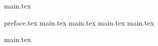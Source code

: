 




\clearpage

{main.tex}

\tableofcontents

\clearpage
{}
\pagestyle{fancy}
\setcounter{page}{8}

\clearpage

{preface.tex}
{main.tex}
{main.tex}
{main.tex}
{main.tex}

\clearpage
{}
{}
\renewcommand\bibname{Перелік посилань}


{main.tex}


